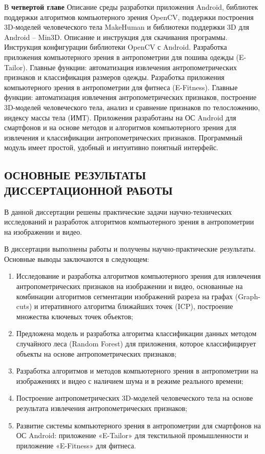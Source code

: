 В \textbf{четвертой главе} Описание среды разработки приложения Android, библиотек поддержки алгоритмов компьютерного зрения OpenCV, поддержки построения 3D-моделей человеческого тела MakeHuman и библиотеки поддержки 3D для Android – Min3D. Описание и инструкция для скачивания программы. Инструкция конфигурации библиотеки OpenCV с Android. Разработка приложения компьютерного зрения в антропометрии для пошива одежды (E-Tailor). Главные функции: автоматизация извлечения антропометрических признаков и классификация размеров одежды. Разработка приложения компьютерного зрения в антропометрии для фитнеса (E-Fitness). Главные функции: автоматизация извлечения антропометрических признаков, построение 3D-моделей человеческого тела, анализ и сравнение признаков по телосложению, индексу массы тела (ИМТ). Приложения разработаны на ОС Android для смартфонов и на основе методов и алгоритмов компьютерного зрения для извлечения и классификации антропометрических признаков. Программный модуль имеет простой, удобный и интуитивно понятный интерфейс.

\subsection*{ОСНОВНЫЕ РЕЗУЛЬТАТЫ ДИССЕРТАЦИОННОЙ РАБОТЫ}
В данной диссертации решены практические задачи научно-технических исследований и разработок алгоритмов компьютерного зрения в антропометрии на изображении и видео.

В диссертации выполнены работы и получены научно-практические результаты. Основные выводы заключаются в следующем:

\begin{enumerate}
	\item Исследование и разработка алгоритмов компьютерного зрения для  извлечения антропометрических признаков на изображении и видео, основанные на комбинации алгоритмов сегментации изображений разреза на графах (Graph-cuts) и итеративного алгоритма ближайших точек (ICP), построение множества ключевых точек объектов;
	\item Предложена модель и разработка алгоритма классификации данных методом случайного леса (Random Forest) для приложения, которое классифицирует объекты на основе антропометрических признаков;
	\item Разработка алгоритмов и методов компьютерного зрения в антропометрии на изображениях и видео с наличием шума и в режиме реального времени;
	\item Построение антропометрических 3D-моделей человеческого тела на основе результата извлечения антропометрических признаков;
	\item Развитие системы компьютерного зрения в антропометрии для смартфонов на ОС Android: приложение «E-Tailor» для текстильной промышленности и приложение «E-Fitness» для фитнеса.
\end{enumerate}



